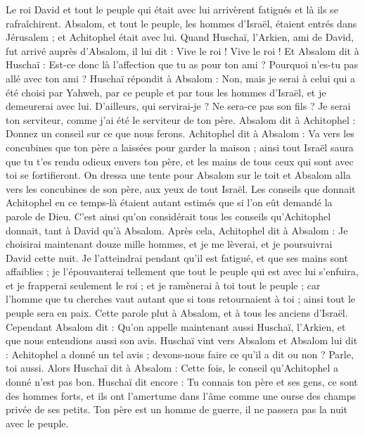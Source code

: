 \begin{multicols}{2}
Le roi David et tout le peuple qui était avec lui arrivèrent fatigués et là ils se rafraîchirent.
Absalom, et tout le peuple, les hommes d'Israël, étaient entrés dans Jérusalem ; et Achitophel était avec lui.
Quand Huschaï, l'Arkien, ami de David, fut arrivé auprès d'Absalom, il lui dit : Vive le roi ! Vive le roi !
Et Absalom dit à Huschaï : Est-ce donc là l'affection que tu as pour ton ami ? Pourquoi n'es-tu pas allé avec ton ami ?
Huschaï répondit à Absalom : Non, mais je serai à celui qui a été choisi par Yahweh, par ce peuple et par tous les hommes d'Israël, et je demeurerai avec lui.
D'ailleurs, qui servirai-je ? Ne sera-ce pas son fils ? Je serai ton serviteur, comme j'ai été le serviteur de ton père.
Absalom dit à Achitophel : Donnez un conseil sur ce que nous ferons.
Achitophel dit à Absalom : Va vers les concubines que ton père a laissées pour garder la maison ; ainsi tout Israël saura que tu t'es rendu odieux envers ton père, et les mains de tous ceux qui sont avec toi se fortifieront.
On dressa une tente pour Absalom sur le toit et Absalom alla vers les concubines de son père, aux yeux de tout Israël.
Les conseils que donnait Achitophel en ce temps-là étaient autant estimés que si l'on eût demandé la parole de Dieu. C'est ainsi qu'on considérait tous les conseils qu'Achitophel donnait, tant à David qu'à Absalom.
\VerseOne{}Après cela, Achitophel dit à Absalom : Je choisirai maintenant douze mille hommes, et je me lèverai, et je poursuivrai David cette nuit.
Je l'atteindrai pendant qu'il est fatigué, et que ses mains sont affaiblies ; je l'épouvanterai tellement que tout le peuple qui est avec lui s'enfuira, et je frapperai seulement le roi ;
et je ramènerai à toi tout le peuple ; car l'homme que tu cherches vaut autant que si tous retournaient à toi ; ainsi tout le peuple sera en paix.
Cette parole plut à Absalom, et à tous les anciens d'Israël.
Cependant Absalom dit : Qu'on appelle maintenant aussi Huschaï, l'Arkien, et que nous entendions aussi son avis.
Huschaï vint vers Absalom et Absalom lui dit : Achitophel a donné un tel avis ; devons-nous faire ce qu'il a dit ou non ? Parle, toi aussi.
Alors Huschaï dit à Absalom : Cette fois, le conseil qu'Achitophel a donné n'est pas bon.
Huschaï dit encore : Tu connais ton père et ses gens, ce sont des hommes forts, et ils ont l'amertume dans l'âme comme une ourse des champs privée de ses petits. Ton père est un homme de guerre, il ne passera pas la nuit avec le peuple.

\end{multicols}

